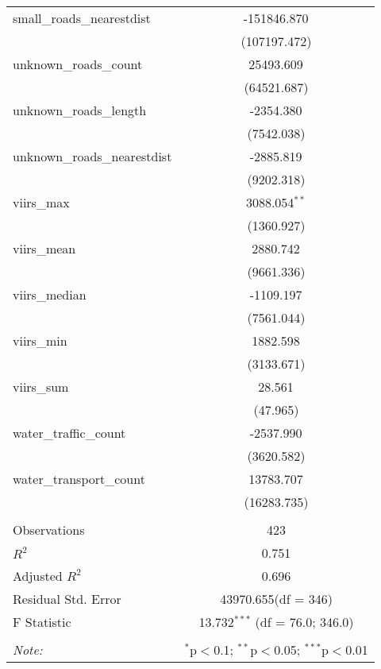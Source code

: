 \begin{table}[!htbp]
\begin{tabular}{@{\extracolsep{5pt}}lc}
 small_roads_nearestdist & -151846.870$^{}$ \\
  & (107197.472) \\
 unknown_roads_count & 25493.609$^{}$ \\
  & (64521.687) \\
 unknown_roads_length & -2354.380$^{}$ \\
  & (7542.038) \\
 unknown_roads_nearestdist & -2885.819$^{}$ \\
  & (9202.318) \\
 viirs_max & 3088.054$^{**}$ \\
  & (1360.927) \\
 viirs_mean & 2880.742$^{}$ \\
  & (9661.336) \\
 viirs_median & -1109.197$^{}$ \\
  & (7561.044) \\
 viirs_min & 1882.598$^{}$ \\
  & (3133.671) \\
 viirs_sum & 28.561$^{}$ \\
  & (47.965) \\
 water_traffic_count & -2537.990$^{}$ \\
  & (3620.582) \\
 water_transport_count & 13783.707$^{}$ \\
  & (16283.735) \\
\hline \\[-1.8ex]
 Observations & 423 \\
 $R^2$ & 0.751 \\
 Adjusted $R^2$ & 0.696 \\
 Residual Std. Error & 43970.655(df = 346)  \\
 F Statistic & 13.732$^{***}$ (df = 76.0; 346.0) \\
\hline
\hline \\[-1.8ex]
\textit{Note:} & \multicolumn{1}{r}{$^{*}$p$<$0.1; $^{**}$p$<$0.05; $^{***}$p$<$0.01} \\
\end{tabular}
\end{table}